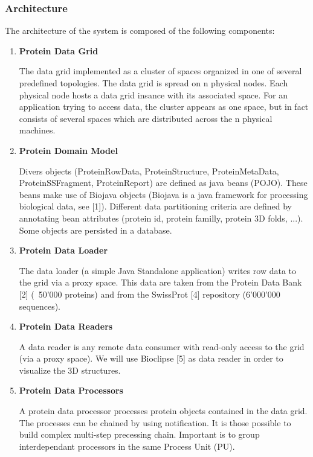 \documentclass[a4paper,10pt]{article}
\begin{document}
\subsubsection{Architecture}
The architecture of the system is composed of the following components:
\begin{enumerate}
 \item \textbf{Protein Data Grid}

The data grid implemented as a cluster of spaces organized in one of several predefined topologies. The data grid is spread on n physical nodes. Each physical node hosts a data grid insance with its associated space. 
For an application trying to access data, the cluster appears as one space, but in fact consists of several spaces which are distributed across the n physical machines.

\item \textbf{Protein Domain Model}

Divers objects (ProteinRowData, ProteinStructure, ProteinMetaData, ProteinSSFragment, ProteinReport) are defined as java beans (POJO). These beans make use of Biojava objects (Biojava is a java framework for processing biological data, see [1]). 
Different data partitioning criteria are defined by annotating bean attributes (protein id, protein familly, protein 3D folds, ...).
Some objects are persisted in a database.

\item \textbf{Protein Data Loader}

The data loader (a simple Java Standalone application) writes row data to the grid via a proxy space. This data are taken from the Protein Data Bank [2] (~50'000 proteins) and from the SwissProt [4] repository (6'000'000 sequences).

\item \textbf{Protein Data Readers}

A data reader is any remote data consumer with read-only access to the grid (via a proxy space). We will use Bioclipse [5] as data reader in order to visualize the 3D structures.
 
\item \textbf{Protein Data Processors}

A protein data processor processes protein objects contained in the data grid. The processes can be chained by using notification. It is those possible to build complex multi-step precessing chain. Important is to group interdependant processors in the same Process Unit (PU). 


\end{enumerate}
\end{document}
